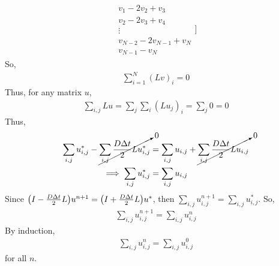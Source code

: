 \documentclass{article} %
\theoremstyle{plain}
\newcommand{\Dt}{\Delta t}
\numberwithin{equation}{section} %
\numberwithin{figure}{section} %
\numberwithin{table}{section} %
\begin{document}
\begin{enumerate}[\ \ (a)]
\begin{align*}
\begin{array}{c}
                v_1 - 2v_2 + v_3 \\
                v_2 - 2v_3 + v_4 \\
                \vdots \\
                v_{N-2} - 2v_{N-1} + v_N \\
                v_{N-1} - v_N
            \end{array}]
        \end{align*}
        So,
        \begin{align*}
            \sum_{i=1}^N (Lv)_i = 0
        \end{align*}
        Thus, for any matrix $u$,
        \begin{align*}
            \sum_{i,j}Lu = \sum_j\sum_i (Lu_j)_i = \sum_j 0 = 0
        \end{align*}
        Thus,
        \begin{align*}
            \sum_{i,j}u_{i,j}^* - \cancelto{0}{\sum_{i,j}\frac{D\Dt}{2}Lu_{i,j}^*} &= \sum_{i,j}u_{i,j} + \cancelto{0}{\sum_{i,j}\frac{D\Dt}{2}Lu_{i,j}} \\
            \implies \sum_{i,j}u_{i,j}^* &= \sum_{i,j}u_{i,j}
        \end{align*}
        Since $\qty(I - \frac{D\Dt}{2}L)u^{n+1} = \qty(I + \frac{D\Dt}{2}L)u^*$, then $\sum_{i,j}u_{i,j}^{n+1} = \sum_{i,j}u_{i,j}^*$.  So,
        \begin{align*}
            \sum_{i,j}u_{i,j}^{n+1} = \sum_{i,j}u_{i,j}^n
        \end{align*}
        By induction,
        \begin{align*}
            \sum_{i,j}u_{i,j}^n = \sum_{i,j}u_{i,j}^0
        \end{align*}
        for all $n$.


\end{enumerate}
\end{document}
